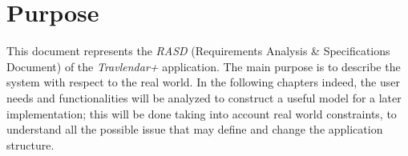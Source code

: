 \section{Purpose}
This document represents the \emph{RASD} (Requirements Analysis \& Specifications Document) of the \emph{Travlendar+} application. The main purpose is to describe the system with respect to the real world. In the following chapters indeed, the user needs and functionalities will be analyzed to construct a useful model for a later implementation; this will be done taking into account real world constraints, to understand all the possible issue that may define and change the application structure. 

